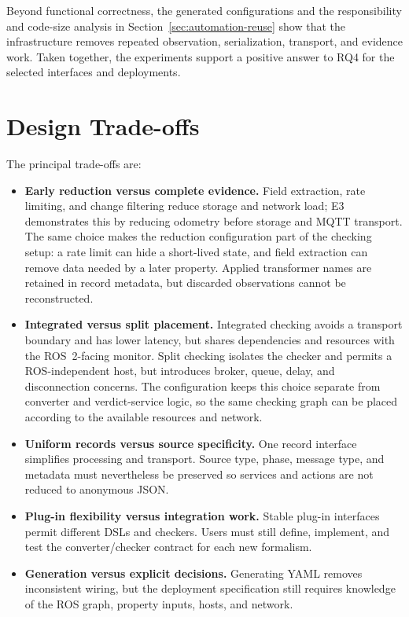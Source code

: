 Beyond functional correctness, the generated configurations and the
responsibility and code-size analysis in
Section~\ref{sec:automation-reuse} show that the infrastructure removes
repeated observation, serialization, transport, and evidence work. Taken
together, the experiments support a positive answer to RQ4 for the selected
interfaces and deployments.

\section{Design Trade-offs}

The principal trade-offs are:

\begin{itemize}
  \item \textbf{Early reduction versus complete evidence.} Field extraction,
  rate limiting, and change filtering reduce storage and network load; E3
  demonstrates this by reducing odometry before storage and MQTT transport.
  The same choice makes the reduction configuration part of the checking
  setup: a rate limit can hide a short-lived state, and field extraction can
  remove data needed by a later property. Applied transformer names are
  retained in record metadata, but discarded observations cannot be
  reconstructed.

  \item \textbf{Integrated versus split placement.} Integrated checking avoids
  a transport boundary and has lower latency, but shares dependencies and
  resources with the ROS~2-facing monitor. Split checking isolates the checker
  and permits a ROS-independent host, but introduces broker, queue, delay, and
  disconnection concerns. The configuration keeps this choice separate from
  converter and verdict-service logic, so the same checking graph can be
  placed according to the available resources and network.

  \item \textbf{Uniform records versus source specificity.} One record
  interface simplifies processing and transport. Source type, phase, message
  type, and metadata must nevertheless be preserved so services and actions are
  not reduced to anonymous JSON.

  \item \textbf{Plug-in flexibility versus integration work.} Stable plug-in
  interfaces permit different DSLs and checkers. Users must still define,
  implement, and test the converter/checker contract for each new formalism.

  \item \textbf{Generation versus explicit decisions.} Generating YAML removes
  inconsistent wiring, but the deployment specification still requires
  knowledge of the ROS graph, property inputs, hosts, and network.
\end{itemize}

